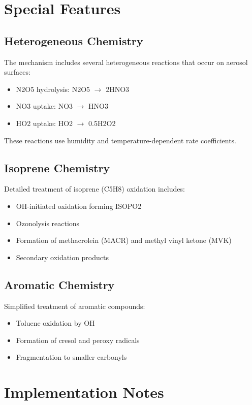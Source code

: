 \documentclass[12pt,a4paper]{article}
\begin{document}
\section{Special Features}

\subsection{Heterogeneous Chemistry}
The mechanism includes several heterogeneous reactions that occur on aerosol surfaces:
\begin{itemize}
    \item N2O5 hydrolysis: N2O5 $\rightarrow$ 2HNO3
    \item NO3 uptake: NO3 $\rightarrow$ HNO3
    \item HO2 uptake: HO2 $\rightarrow$ 0.5H2O2
\end{itemize}

These reactions use humidity and temperature-dependent rate coefficients.

\subsection{Isoprene Chemistry}
Detailed treatment of isoprene (C5H8) oxidation includes:
\begin{itemize}
    \item OH-initiated oxidation forming ISOPO2
    \item Ozonolysis reactions
    \item Formation of methacrolein (MACR) and methyl vinyl ketone (MVK)
    \item Secondary oxidation products
\end{itemize}

\subsection{Aromatic Chemistry}
Simplified treatment of aromatic compounds:
\begin{itemize}
    \item Toluene oxidation by OH
    \item Formation of cresol and peroxy radicals
    \item Fragmentation to smaller carbonyls
\end{itemize}

\section{Implementation Notes}
\end{document}
